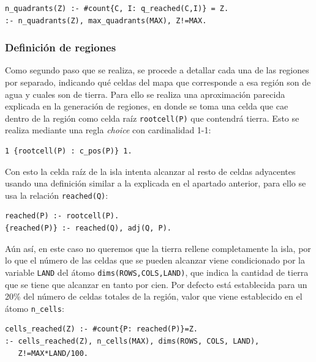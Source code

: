 \begin{lstlisting}[label=lst:qmax]
n_quadrants(Z) :- #count{C, I: q_reached(C,I)} = Z.
:- n_quadrants(Z), max_quadrants(MAX), Z!=MAX.
\end{lstlisting}

\subsubsection{Definición de regiones}
\label{subsubsec:cuadrantes}

Como segundo paso que se realiza, se procede a detallar cada una de las regiones por separado, indicando qué celdas del mapa que corresponde a esa región son de agua y cuales son de tierra. Para ello se realiza una aproximación parecida explicada en la generación de regiones, en donde se toma una celda que cae dentro de la región como celda raíz \texttt{rootcell(P)} que contendrá tierra. Esto se realiza mediante una regla \textit{choice} con cardinalidad 1-1: \\

\begin{lstlisting}[label=lst:croot]
1 {rootcell(P) : c_pos(P)} 1.
\end{lstlisting}

\hspace{1em}

Con esto la celda raíz de la isla intenta alcanzar al resto de celdas adyacentes usando una definición similar a la explicada en el apartado anterior, para ello se usa la relación \texttt{reached(Q)}: \\

\begin{lstlisting}[label=lst:croot]
reached(P) :- rootcell(P).
{reached(P)} :- reached(Q), adj(Q, P).
\end{lstlisting}

\hspace{1em}

Aún así, en este caso no queremos que la tierra rellene completamente la isla, por lo que el número de las celdas que se pueden alcanzar viene condicionado por la variable \texttt{LAND} del átomo \texttt{dims(ROWS,COLS,LAND)}, que indica la cantidad de tierra que se tiene que alcanzar en tanto por cien. Por defecto está establecida para un 20\% del número de celdas totales de la región, valor que viene establecido en el átomo \texttt{n\_cells}: \\

\begin{lstlisting}[label=lst:cmax]
cells_reached(Z) :- #count{P: reached(P)}=Z.
:- cells_reached(Z), n_cells(MAX), dims(ROWS, COLS, LAND),
   Z!=MAX*LAND/100.
\end{lstlisting}

